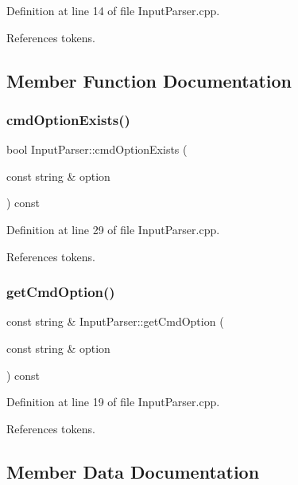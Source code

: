 Definition at line 14 of file Input\+Parser.\+cpp.



References tokens.



\subsection{Member Function Documentation}
\mbox{\label{class_input_parser_ad3d06a9c59e91f425295bdc8408e0544}} 
\subsubsection{cmdOptionExists()}
{\footnotesize\ttfamily bool Input\+Parser\+::cmd\+Option\+Exists (\begin{DoxyParamCaption}\item[{const string \&}]{option }\end{DoxyParamCaption}) const}



Definition at line 29 of file Input\+Parser.\+cpp.



References tokens.

\mbox{\label{class_input_parser_a494c1de8c06fbb5a88343686e36fbf50}} 
\subsubsection{getCmdOption()}
{\footnotesize\ttfamily const string \& Input\+Parser\+::get\+Cmd\+Option (\begin{DoxyParamCaption}\item[{const string \&}]{option }\end{DoxyParamCaption}) const}



Definition at line 19 of file Input\+Parser.\+cpp.



References tokens.



\subsection{Member Data Documentation}
\mbox{\label{class_input_parser_a4bd1105d6fc64bd0e825dc2e34515d75}} 
